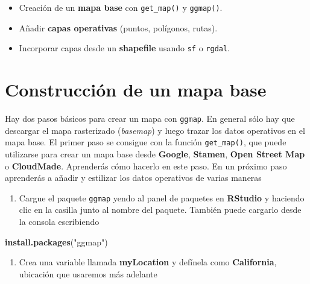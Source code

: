 \documentclass[
]{book}
\newenvironment{Shaded}{\begin{snugshade}}{\end{snugshade}}
\newcommand{\FunctionTok}[1]{\textcolor[rgb]{0.13,0.29,0.53}{\textbf{#1}}}
\newcommand{\NormalTok}[1]{#1}
\newcommand{\StringTok}[1]{\textcolor[rgb]{0.31,0.60,0.02}{#1}}
\providecommand{\tightlist}{%
  \setlength{\itemsep}{0pt}\setlength{\parskip}{0pt}}
\begin{document}
\begin{itemize}
\tightlist
\item
  Creación de un \textbf{mapa base} con \texttt{get\_map()} y \texttt{ggmap()}.\\
\item
  Añadir \textbf{capas operativas} (puntos, polígonos, rutas).\\
\item
  Incorporar capas desde un \textbf{shapefile} usando \texttt{sf} o \texttt{rgdal}.
\end{itemize}

\section{Construcción de un mapa base}\label{construcciuxf3n-de-un-mapa-base}

Hay dos pasos básicos para crear un mapa con \texttt{ggmap}. En general sólo hay que descargar el mapa rasterizado (\emph{basemap}) y luego trazar los datos operativos en el mapa base. El primer paso se consigue con la función \texttt{get\_map()}, que puede utilizarse para crear un mapa base desde \textbf{Google}, \textbf{Stamen}, \textbf{Open Street Map} o \textbf{CloudMade}. Aprenderás cómo hacerlo en este paso. En un próximo paso aprenderás a añadir y estilizar los datos operativos de varias maneras

\begin{enumerate}
\def\labelenumi{\arabic{enumi}.}
\tightlist
\item
  Cargue el paquete \texttt{ggmap} yendo al panel de paquetes en \textbf{RStudio} y haciendo clic en la casilla junto al nombre del paquete. También puede cargarlo desde la consola escribiendo
\end{enumerate}

\begin{Shaded}
\begin{Highlighting}[]
\FunctionTok{install.packages}\NormalTok{(}\StringTok{"ggmap"}\NormalTok{)}
\end{Highlighting}
\end{Shaded}

\begin{enumerate}
\def\labelenumi{\arabic{enumi}.}
\setcounter{enumi}{1}
\tightlist
\item
  Crea una variable llamada \textbf{myLocation} y defínela como \textbf{California}, ubicación que usaremos más adelante
\end{enumerate}
\end{document}
